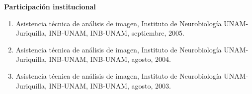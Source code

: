 {\large \textbf{\color{red}\textbf{Participación institucional}}}

\begin{enumerate}
\item Asistencia técnica de análisis de imagen, Instituto de Neurobiología UNAM-Juriquilla, INB-UNAM, INB-UNAM, septiembre, 2005.

\item Asistencia técnica de análisis de imagen, Instituto de Neurobiología UNAM-Juriquilla, INB-UNAM, INB-UNAM, agosto, 2004.

\item Asistencia técnica de análisis de imagen, Instituto de Neurobiología UNAM-Juriquilla, INB-UNAM, INB-UNAM, agosto, 2003.

\end{enumerate}
